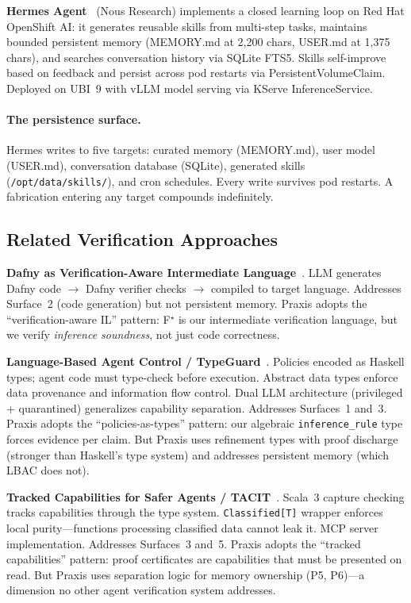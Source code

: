 \documentclass[sigplan,screen,nonacm]{acmart}
\newcommand{\fstar}{F\ensuremath{^\star}}
\begin{document}
\textbf{Hermes Agent}~\cite{hermes2026} (Nous Research) implements a closed
learning loop on Red Hat OpenShift AI: it generates reusable skills from
multi-step tasks, maintains bounded persistent memory (MEMORY.md at 2{,}200
chars, USER.md at 1{,}375 chars), and searches conversation history via
SQLite FTS5. Skills self-improve based on feedback and persist across pod
restarts via PersistentVolumeClaim. Deployed on UBI~9 with vLLM model
serving via KServe InferenceService.

\paragraph{The persistence surface.}
Hermes writes to five targets: curated memory (MEMORY.md), user model
(USER.md), conversation database (SQLite), generated skills
(\texttt{/opt/data/skills/}), and cron schedules. Every write survives pod
restarts. A fabrication entering any target compounds indefinitely.

\subsection{Related Verification Approaches}

\textbf{Dafny as Verification-Aware Intermediate Language}~\cite{li2025dafny}.
LLM generates Dafny code $\to$ Dafny verifier checks $\to$ compiled to
target language. Addresses Surface~2 (code generation) but not persistent
memory. Praxis adopts the ``verification-aware IL'' pattern: \fstar{} is our
intermediate verification language, but we verify \emph{inference
soundness}, not just code correctness.

\textbf{Language-Based Agent Control / TypeGuard}~\cite{zhou2026lbac}.
Policies encoded as Haskell types; agent code must type-check before
execution. Abstract data types enforce data provenance and information flow
control. Dual LLM architecture (privileged + quarantined) generalizes
capability separation. Addresses Surfaces~1 and~3. Praxis adopts the
``policies-as-types'' pattern: our algebraic \texttt{inference\_rule} type
forces evidence per claim. But Praxis uses refinement types with proof
discharge (stronger than Haskell's type system) and addresses persistent
memory (which LBAC does not).

\textbf{Tracked Capabilities for Safer Agents / TACIT}~\cite{odersky2026tacit}.
Scala~3 capture checking tracks capabilities through the type system.
\texttt{Classified[T]} wrapper enforces local purity---functions processing
classified data cannot leak it. MCP server implementation. Addresses
Surfaces~3 and~5. Praxis adopts the ``tracked capabilities'' pattern: proof
certificates are capabilities that must be presented on read. But Praxis
uses separation logic for memory ownership (P5, P6)---a dimension no other
agent verification system addresses.
\end{document}
